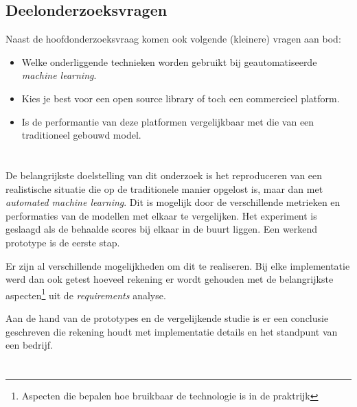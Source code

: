 \subsection{Deelonderzoeksvragen}
\label{subsec:deelonderzoeksvragen}

Naast de hoofdonderzoeksvraag komen ook volgende (kleinere) vragen aan bod:

\begin{itemize}
    \item Welke onderliggende technieken worden gebruikt bij geautomatiseerde \textit{machine learning}.
    \item Kies je best voor een open source library of toch een commercieel platform.
    \item Is de performantie van deze platformen vergelijkbaar met die van een traditioneel gebouwd model.
\end{itemize}

\section{}
\label{sec:onderzoeksdoelstelling}

De belangrijkste doelstelling van dit onderzoek is het reproduceren van een realistische situatie die op de traditionele manier opgelost is, maar dan met \textit{automated machine learning}. Dit is mogelijk door de verschillende metrieken en performaties van de modellen met elkaar te vergelijken. Het experiment is geslaagd als de behaalde scores bij elkaar in de buurt liggen. Een werkend prototype is de eerste stap.

Er zijn al verschillende mogelijkheden om dit te realiseren. Bij elke implementatie werd dan ook getest hoeveel rekening er wordt gehouden met de belangrijkste aspecten\footnote{Aspecten die bepalen hoe bruikbaar de technologie is in de praktrijk} uit de \textit{requirements} analyse.

Aan de hand van de prototypes en de vergelijkende studie is er een conclusie geschreven die rekening houdt met implementatie details en het standpunt van een bedrijf.

\section{}
\label{sec:opzet-bachelorproef}


